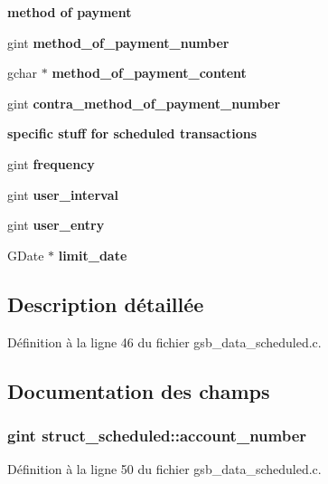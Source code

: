 \begin{Indent}{\bf method of payment}\par
{\em \label{_amgrpbbdbbfa765cb9005b09822cb581df3b1}
 }\begin{DoxyCompactItemize}
\item 
gint {\bf method\_\-of\_\-payment\_\-number}
\item 
gchar $\ast$ {\bf method\_\-of\_\-payment\_\-content}
\item 
gint {\bf contra\_\-method\_\-of\_\-payment\_\-number}
\end{DoxyCompactItemize}
\end{Indent}
\begin{Indent}{\bf specific stuff for scheduled transactions}\par
{\em \label{_amgrp9fc68954816ca6123a933e05bde05245}
 }\begin{DoxyCompactItemize}
\item 
gint {\bf frequency}
\item 
gint {\bf user\_\-interval}
\item 
gint {\bf user\_\-entry}
\item 
GDate $\ast$ {\bf limit\_\-date}
\end{DoxyCompactItemize}
\end{Indent}


\subsection{Description détaillée}


Définition à la ligne 46 du fichier gsb\_\-data\_\-scheduled.c.



\subsection{Documentation des champs}
\subsubsection[{account\_\-number}]{\setlength{\rightskip}{0pt plus 5cm}gint {\bf struct\_\-scheduled::account\_\-number}}\label{structstruct__scheduled_ae6628039c0ffc9dac8a8900d12881fb3}


Définition à la ligne 50 du fichier gsb\_\-data\_\-scheduled.c.

